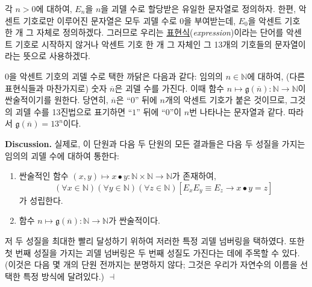 \documentclass[12pt]{paper}
\newcommand{\gnum}
{ \mathfrak{g} }
\newenvironment{context}[1][]
{ \noindent \textbf{{#1}.} }
{ \hfill $ \dashv $ }
\begin{document}
각 $n > 0$에 대하여, $E_{n}$을 $n$을 괴델 수로 할당받은 유일한 문자열로 정의하자.
한편, 악센트 기호로만 이루어진 문자열은 모두 괴델 수로 $0$을 부여받는데, $E_{0}$을 악센트 기호 한 개 그 자체로 정의하겠다.
그러므로 우리는 \underline{표현식}(\textit{expression})이라는 단어를 악센트 기호로 시작하지 않거나 악센트 기호 한 개 그 자체인 그 13개의 기호들의 문자열이라는 뜻으로 사용하겠다.

$0$을 악센트 기호의 괴델 수로 택한 까닭은 다음과 같다:
임의의 $n \in \mathbb{N}$에 대하여, (다른 표현식들과 마찬가지로) 숫자 $\overline{n}$은 괴델 수를 가진다.
이때 함수 $n \mapsto \gnum \left( \overline{n} \right) : \mathbb{N} \to \mathbb{N}$이 싼술적이기를 원한다.
당연히, $\overline{n}$은 ``$0$'' 뒤에 $n$개의 악센트 기호가 붙은 것이므로,
그것의 괴델 수를 13진법으로 표기하면 ``$1$'' 뒤에 ``$0$''이 $n$번 나타나는 문자열과 같다.
따라서 $\gnum \left( \overline{n} \right) = 13^{n}$이다.

\begin{context}[Discussion]
실제로, 이 단원과 다음 두 단원의 모든 결과들은 다음 두 성질을 가지는 임의의 괴델 수에 대하여 통한다:
\begin{enumerate}
\item 싼술적인 함수 $\left( x , y \right) \mapsto x \bullet y : \mathbb{N} \times \mathbb{N} \to \mathbb{N}$가 존재하여,
$$ \left( \forall x \in \mathbb{N} \right) \left( \forall y \in \mathbb{N} \right) \left( \forall z \in \mathbb{N} \right) \left[ E_x E_y \equiv E_z \rightarrow x \bullet y = z \right] $$가 성립한다.
\item 함수 $n \mapsto \gnum \left( \overline{n} \right) : \mathbb{N} \to \mathbb{N}$가 싼술적이다.
\end{enumerate}

저 두 성질을 최대한 빨리 달성하기 위하여 저러한 특정 괴델 넘버링을 택하였다.
또한 첫 번째 성질을 가지는 괴델 넘버링은 두 번째 성질도 가진다는 데에 주목할 수 있다.
(이것은 다음 몇 개의 단원 전까지는 분명하지 않다;
그것은 우리가 자연수의 이름을 선택한 특정 방식에 달려있다.)
\end{context}
\end{document}
